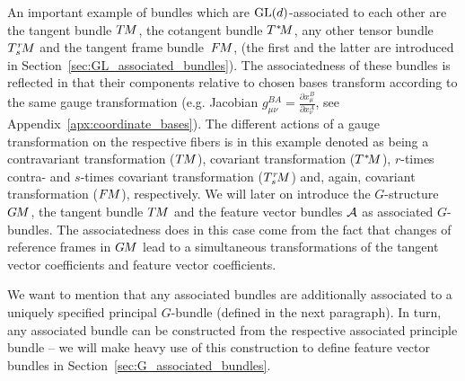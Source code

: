 An important example of bundles which are $\operatorname{GL}(d)$-associated to each other are the tangent bundle $T\mkern-1.5muM$, the cotangent bundle $T^{\mkern0.5mu *}\mkern-3.5muM$, any other tensor bundle $\TrsM$ and the tangent frame bundle~$F\mkern-1.5muM$, (the first and the latter are introduced in Section~\ref{sec:GL_associated_bundles}).
The associatedness of these bundles is reflected in that their components relative to chosen bases transform according to the same gauge transformation (e.g. Jacobian $g^{BA}_{\mu\nu} = \frac{\partial x^B_\mu}{\partial x^A_\nu}$, see Appendix~\ref{apx:coordinate_bases}).
The different actions of a gauge transformation on the respective fibers is in this example denoted as being a contravariant transformation ($T\mkern-1.5muM$), covariant transformation ($T^{\mkern0.5mu *}\mkern-3.5muM$), $r$-times contra- and $s$-times covariant transformation ($\TrsM$) and, again, covariant transformation ($F\mkern-1.5muM$), respectively.
We will later on introduce the $G$-structure $G\mkern-1.4muM$, the tangent bundle $T\mkern-1.5muM$ and the feature vector bundles $\mathcal{A}$ as associated $G$-bundles.
The associatedness does in this case come from the fact that changes of reference frames in $G\mkern-1.4muM$ lead to a simultaneous transformations of the tangent vector coefficients and feature vector coefficients.

We want to mention that any associated bundles are additionally associated to a uniquely specified principal $G$-bundle (defined in the next paragraph).
In turn, any associated bundle can be constructed from the respective associated principle bundle -- we will make heavy use of this construction to define feature vector bundles in Section~\ref{sec:G_associated_bundles}.








